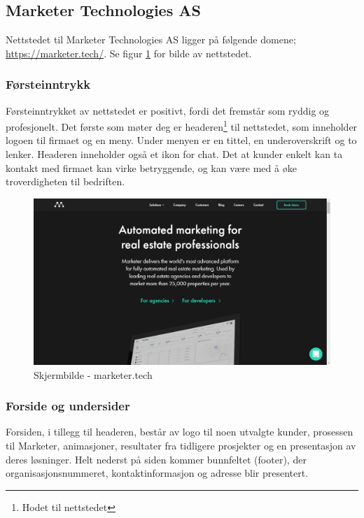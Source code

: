 \subsection{Marketer Technologies AS}
Nettstedet til Marketer Technologies AS ligger på følgende domene;
\url{https://marketer.tech/}. Se figur \ref{fig:competitors-marketer.tech} for bilde av nettstedet.

\subsubsection{Førsteinntrykk}
Førsteinntrykket av nettstedet er positivt, fordi det fremstår som ryddig og profesjonelt. Det første som møter deg er headeren\footnote{Hodet til nettstedet} til nettstedet, som inneholder logoen til firmaet og en meny. Under menyen er en tittel, en underoverskrift og to lenker. Headeren inneholder også et ikon for chat. Det at kunder enkelt kan ta kontakt med firmaet kan virke betryggende, og kan være med å øke troverdigheten til bedriften.

\begin{figure}[H]
    \centering
    \includegraphics[width=\textwidth]{line/marketer_tech_(1366x768).png}
    \caption{Skjermbilde - marketer.tech}
    \label{fig:competitors-marketer.tech}
\end{figure}

\subsubsection{Forside og undersider}

Forsiden, i tillegg til headeren, består av logo til noen utvalgte kunder, prosessen til Marketer, animasjoner, resultater fra tidligere prosjekter og en presentasjon av deres løsninger. Helt nederst på siden kommer bunnfeltet (footer), der organisasjonsnummeret, kontaktinformasjon og adresse blir presentert.

